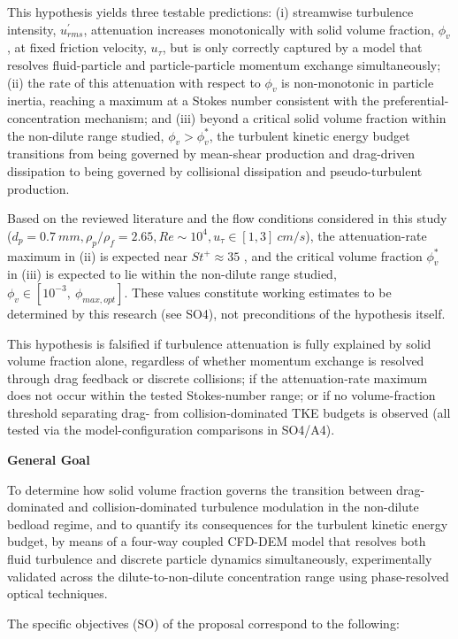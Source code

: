 This hypothesis yields three testable predictions: (i) streamwise turbulence intensity, \(u_{rms}^{'}\), attenuation increases monotonically with solid volume fraction, \(\phi_{v}\), at fixed friction velocity, \(u_{\tau}\), but is only correctly captured by a model that resolves fluid-particle and particle-particle momentum exchange simultaneously; (ii) the rate of this attenuation with respect to \(\phi_{v}\) is non-monotonic in particle inertia, reaching a maximum at a Stokes number consistent with the preferential-concentration mechanism; and (iii) beyond a critical solid volume fraction within the non-dilute range studied, \(\phi_{v} > \phi_{v}^{*}\), the turbulent kinetic energy budget transitions from being governed by mean-shear production and drag-driven dissipation to being governed by collisional dissipation and pseudo-turbulent production.

Based on the reviewed literature and the flow conditions considered in this study (\(d_{p} = 0.7\ mm, \rho_{p}/\rho_{f} = 2.65, Re \sim 10^{4}, u_{\tau} \in [1,3]\ cm/s\)), the attenuation-rate maximum in (ii) is expected near \(St^{+} \approx 35\) \cite{lee__2015}, and the critical volume fraction \(\phi_{v}^{*}\) in (iii) is expected to lie within the non-dilute range studied, \(\phi_{v} \in [10^{-3},\ \phi_{max,opt}]\). These values constitute working estimates to be determined by this research (see SO4), not preconditions of the hypothesis itself.

This hypothesis is falsified if turbulence attenuation is fully explained by solid volume fraction alone, regardless of whether momentum exchange is resolved through drag feedback or discrete collisions; if the attenuation-rate maximum does not occur within the tested Stokes-number range; or if no volume-fraction threshold separating drag- from collision-dominated TKE budgets is observed (all tested via the model-configuration comparisons in SO4/A4).

\textbf{General Goal}

To determine how solid volume fraction governs the transition between drag-dominated and collision-dominated turbulence modulation in the non-dilute bedload regime, and to quantify its consequences for the turbulent kinetic energy budget, by means of a four-way coupled CFD-DEM model that resolves both fluid turbulence and discrete particle dynamics simultaneously, experimentally validated across the dilute-to-non-dilute concentration range using phase-resolved optical techniques.

The specific objectives (SO) of the proposal correspond to the following:

